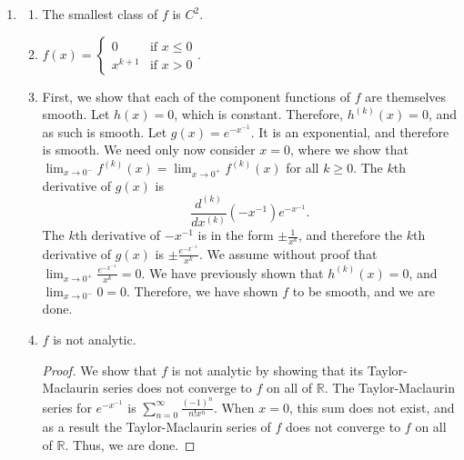 \documentclass[12pt]{article}
\begin{document}
\begin{enumerate}[label=\Alph*.]
    \item
    \begin{enumerate}[label=\theenumi\Alph*]
        \item The smallest class of $f$ is $C^2$.
        \item $f(x)=\begin{cases}
            0 & \text{if } x \leq 0 \\
            x^{k+1} & \text{if } x > 0
        \end{cases}$.
        \item First, we show that each of the component functions of $f$ are themselves smooth. Let $h(x)=0$, which is constant. Therefore, $h^{(k)}(x)=0$, and as such is smooth. Let $g(x)=e^{-x^{-1}}$. It is an exponential, and therefore
              is smooth. We need only now consider $x=0$, where we show that $\lim_{x\rightarrow 0^-}f^{(k)}(x)=\lim_{x\rightarrow 0^+}f^{(k)}(x)$ for all $k\geq 0$. The $k$th derivative of $g(x)$ is \begin{equation}
              \frac{d^{(k)}}{dx^{(k)}}(-x^{-1})e^{-x^{-1}}.
              \end{equation} The $k$th derivative of $-x^{-1}$ is in the form $\pm \frac{1}{x^k}$, and therefore the $k$th derivative of $g(x)$ is $\pm \frac{e^{-x^{-1}}}{x^k}$. We assume without proof that $\lim_{x\rightarrow 0^+}\frac{e^{-x^{-1}}}{x^k}=0$. We have
              previously shown that $h^{(k)}(x)=0$, and $\lim_{x\rightarrow 0^-}{0}=0$. Therefore, we have shown $f$ to be smooth, and we are done.
        \item $f$ is not analytic.
            \begin{proof}
                We show that $f$ is not analytic by showing that its Taylor-Maclaurin series does not converge to $f$ on all of $\mathbb{R}$. The Taylor-Maclaurin series for  $e^{-x^{-1}}$ is
              $\sum_{n=0}^{\infty}\frac{(-1)^n}{n!x^n}$. When $x=0$, this sum does not exist, and as a result the Taylor-Maclaurin
              series of $f$ does not converge to $f$ on all of $\mathbb{R}$. Thus, we are done.
            \end{proof}
    \end{enumerate}
    

\end{enumerate}
\end{document}
